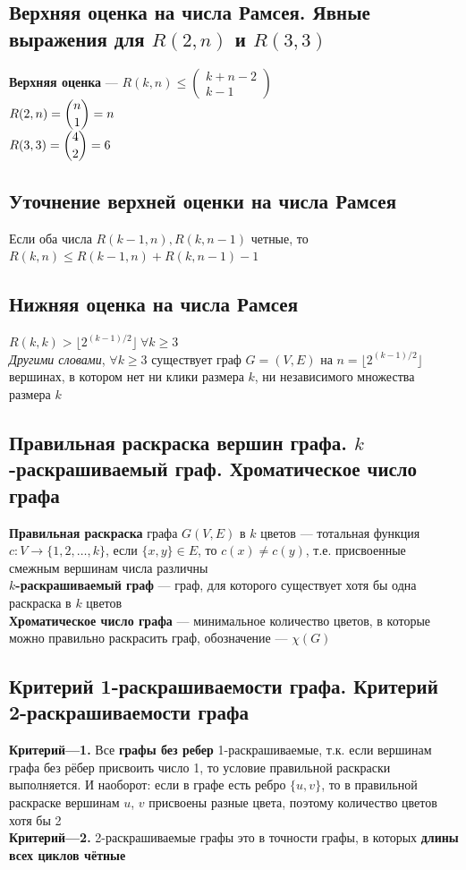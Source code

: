 \documentclass[a4paper]{article}
\begin{document}
\subsection{Верхняя оценка на числа Рамсея. Явные выражения для \texorpdfstring{$R(2,n)$}{R(2,n)} и \texorpdfstring{$R(3,3)$}{R(3,3)}}
\textbf{Верхняя оценка} — $R(k,n)\leqslant\begin{pmatrix}
    k+n-2\\
    k-1
\end{pmatrix}$\\[2mm]
\indent$R(2,n)=\dbinom{n}{1}=n$\\[2mm]
\indent $R(3,3)=\dbinom{4}{2}=6$

\subsection{Уточнение верхней оценки на числа Рамсея}
Если оба числа $R(k-1,n),R(k,n-1)$ четные, то $R(k,n)\leqslant R(k-1,n)+R(k,n-1)-1$

\subsection{Нижняя оценка на числа Рамсея}
$R(k,k)>\lfloor 2^{(k-1)/2}\rfloor\ \forall k\geqslant3$\\[2mm]
\indent \textit{Другими словами}, $\forall k\geqslant3$ существует граф $G=(V,E)$ на $n=\lfloor2^{(k-1)/2}\rfloor$ вершинах, в котором нет ни клики размера $k$, ни независимого множества размера $k$

\subsection{Правильная раскраска вершин графа. \texorpdfstring{$k$}{k}-раскрашиваемый граф. Хроматическое число графа}
\textbf{Правильная раскраска} графа $G(V,E)$ в $k$ цветов — тотальная функция $c: V\rightarrow \{1,2,\ldots,k\}$, если $\{x,y\}\in E$, то $c(x)\ne c(y)$, т.е. присвоенные смежным вершинам числа различны\\[2mm]
\indent \textbf{$k$-раскрашиваемый граф} — граф, для которого существует хотя бы одна раскраска в $k$ цветов\\[2mm]
\indent \textbf{Хроматическое число графа} — минимальное количество цветов, в которые можно правильно раскрасить граф, обозначение — $\chi(G)$

\subsection{Критерий 1-раскрашиваемости графа. Критерий 2-раскрашиваемости графа}
\textbf{Критерий—1.} Все \textbf{графы без ребер} 1-раскрашиваемые, т.к. если вершинам графа без рёбер присвоить число 1, то условие правильной раскраски выполняется. И наоборот: если в графе есть ребро $\{u, v\}$, то в правильной раскраске вершинам $u$, $v$ присвоены разные цвета, поэтому количество цветов хотя бы 2\\[2mm]
\indent\textbf{Критерий—2.} 2-раскрашиваемые графы это в точности графы, в которых \textbf{длины
всех циклов чётные}
\end{document}
